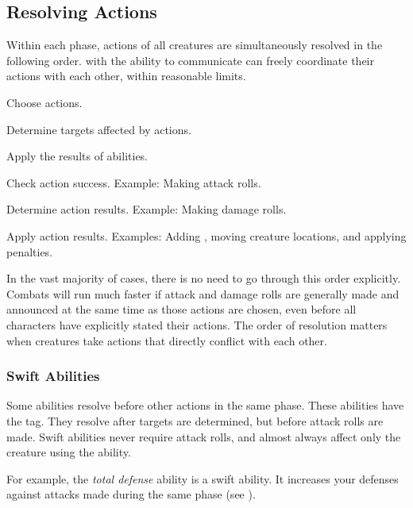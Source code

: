    \subsection{Resolving Actions}\label{Resolving Actions}

        Within each phase, actions of all creatures are simultaneously resolved in the following order.
         with the ability to communicate can freely coordinate their actions with each other, within reasonable limits.

        \begin{enumerate*}
            \item Choose actions.
            \item Determine targets affected by actions.
            \item Apply the results of  abilities.
            \item Check action success.
                Example: Making attack rolls.
            \item Determine action results.
                Example: Making damage rolls.
            \item Apply action results.
                Examples: Adding , moving creature locations, and applying penalties.
        \end{enumerate*}

        In the vast majority of cases, there is no need to go through this order explicitly.
        Combats will run much faster if attack and damage rolls are generally made and announced at the same time as those actions are chosen, even before all characters have explicitly stated their actions.
        The order of resolution matters when creatures take actions that directly conflict with each other.

        \subsubsection{Swift Abilities}\label{Swift Abilities}
            Some abilities resolve before other actions in the same phase.
            These abilities have the  tag.
            They resolve after targets are determined, but before attack rolls are made.
            Swift abilities never require attack rolls, and almost always affect only the creature using the ability.

            For example, the \textit{total defense} ability is a swift ability.
            It increases your defenses against attacks made during the same phase (see ).

